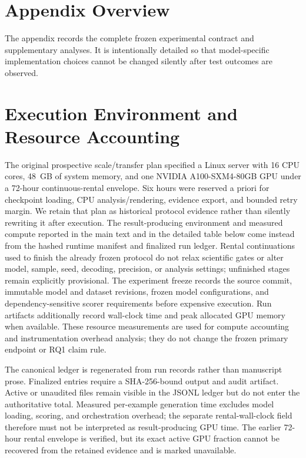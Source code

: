 \section{Appendix Overview}

The appendix records the complete frozen experimental contract and supplementary analyses.
It is intentionally detailed so that model-specific implementation choices cannot be changed silently after test outcomes are observed.

\section{Execution Environment and Resource Accounting}
\label{sec:compute-accounting}

The original prospective scale/transfer plan specified a Linux server with
16 CPU cores, 48~GB of system memory, and one NVIDIA A100-SXM4-80GB GPU under
a 72-hour continuous-rental envelope. Six hours were reserved a priori for
checkpoint loading, CPU analysis/rendering, evidence export, and bounded retry
margin. We retain that plan as historical protocol evidence rather than
silently rewriting it after execution. The result-producing environment and
measured compute reported in the main text and in the detailed table below
come instead from the hashed runtime manifest and finalized run ledger. Rental
continuations used to finish the already frozen protocol do not relax scientific
gates or alter model, sample, seed, decoding, precision, or analysis settings;
unfinished stages remain explicitly provisional.
The experiment freeze records the source commit, immutable model and dataset
revisions, frozen model configurations, and dependency-sensitive scorer
requirements before expensive execution.
Run artifacts additionally record wall-clock time and peak allocated GPU memory
when available.
These resource measurements are used for compute accounting and instrumentation
overhead analysis; they do not change the frozen primary endpoint or RQ1 claim
rule.

The canonical ledger is regenerated from run records rather than manuscript
prose. Finalized entries require a SHA-256-bound output and audit artifact.
Active or unaudited files remain visible in the JSONL ledger but do not enter
the authoritative total. Measured per-example generation time excludes model
loading, scoring, and orchestration overhead; the separate rental-wall-clock
field therefore must not be interpreted as result-producing GPU time. The
earlier 72-hour rental envelope is verified, but its exact active GPU fraction
cannot be recovered from the retained evidence and is marked unavailable.

